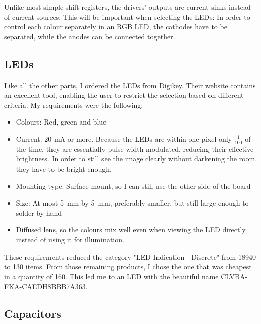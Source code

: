 \documentclass[a4paper, 11pt, titlepage]{report}
\begin{document}
Unlike most simple shift registers, the drivers' outputs are current sinks instead of current
sources. This will be important when selecting the LEDs: In order to control each colour separately
in an RGB LED, the cathodes have to be separated, while the anodes can be connected together.



\subsection{LEDs}

Like all the other parts, I ordered the LEDs from Digikey. Their website contains an excellent
tool, enabling the user to restrict the selection based on different criteria. My requirements
were the following:

\begin{itemize}

\item Colours: Red, green and blue

\item Current: 20 mA or more. Because the LEDs are within one pixel only $\frac{1}{100}$ of the
time, they are essentially pulse width modulated, reducing their effective brightness. In order to
still see the image clearly without darkening the room, they have to be bright enough.

\item Mounting type: Surface mount, so I can still use the other side of the board

\item Size: At most \SI{5}{\milli\meter} by \SI{5}{\milli\meter}, preferably smaller, but still
large enough to solder by hand

\item Diffused lens, so the colours mix well even when viewing the LED directly instead of using
it for illumination.

\end{itemize}

These requirements reduced the category "LED Indication - Discrete" from 18940 to 130 items.
From those remaining products, I chose the one that was cheapest in a quantity of 160. This
led me to an LED with the beautiful name CLVBA-FKA-CAEDH8BBB7A363.



\subsection{Capacitors}
\end{document}
